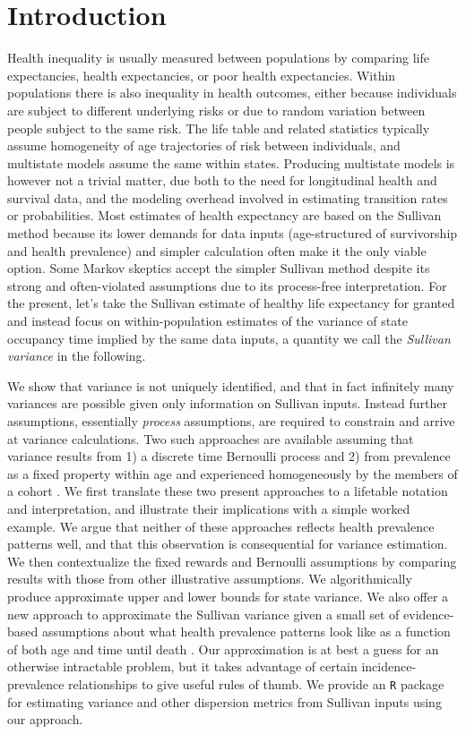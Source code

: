 \documentclass{bmcart}
\begin{document}
\section{Introduction}
Health inequality is usually measured between populations by comparing life expectancies, health expectancies, or poor health expectancies. Within populations there is also inequality in health outcomes, either because individuals are subject to different underlying risks or due to random variation between people subject to the same risk. The life table and related statistics typically assume homogeneity of age trajectories of risk between individuals, and multistate models assume the same within states. Producing multistate models is however not a trivial matter, due both to the need for longitudinal health and survival data, and the modeling overhead involved in estimating transition rates or probabilities. Most estimates of health expectancy are based on the Sullivan method \citep{sullivan1971single} because its lower demands for data inputs (age-structured of survivorship and health prevalence) and simpler calculation often make it the only viable option. Some Markov skeptics accept the simpler Sullivan method despite its strong and often-violated assumptions \citep{mathers1997good, imai2007estimation} due to its process-free interpretation. For the present, let's take the Sullivan estimate of healthy life expectancy for granted and instead focus on within-population estimates of the variance of state occupancy time implied by the same data inputs, a quantity we call the \emph{Sullivan variance} in the following. 

We show that variance is not uniquely identified, and that in fact infinitely many variances are possible given only information on Sullivan inputs. Instead further assumptions, essentially \emph{process} assumptions, are required to constrain and arrive at variance calculations. Two such approaches are available assuming that variance results from 1) a discrete time Bernoulli process and 2) from prevalence as a fixed property within age and experienced homogeneously by the members of a cohort \citep{caswell2018matrix}. We first translate these two present approaches to a lifetable notation and interpretation, and illustrate their implications with a simple worked example. We argue that neither of these approaches reflects health prevalence patterns well, and that this observation is consequential for variance estimation. We then contextualize the fixed rewards and Bernoulli assumptions by comparing results with those from other illustrative assumptions. We algorithmically produce approximate upper and lower bounds for state variance. We also offer a new approach to approximate the Sullivan variance given a small set of evidence-based assumptions about what health prevalence patterns look like as a function of both age and time until death \citep{klijs2010disability, riffe2016time, riffe2017hle}. Our approximation is at best a guess for an otherwise intractable problem, but it takes advantage of certain incidence-prevalence relationships to give useful rules of thumb. We provide an \texttt{R} package for estimating variance and other dispersion metrics from Sullivan inputs using our approach.
\end{document}
